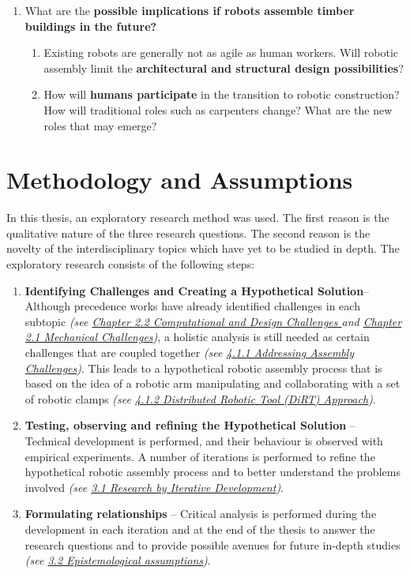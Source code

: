 \documentclass[11pt]{book}
\begin{document}
\begin{enumerate}
\begin{enumerate}
\end{enumerate}
	\item What are the \textbf{possible implications if robots assemble timber buildings in the future?}

\begin{enumerate}
	\item Existing robots are generally not as agile as human workers. Will robotic assembly limit the \textbf{architectural and structural design possibilities}?

	\item How will \textbf{humans participate} in the transition to robotic construction? How will traditional roles such as carpenters change? What are the new roles that may emerge?

\end{enumerate}
\end{enumerate}

\newpage

\chapter{Methodology and Assumptions}

In this thesis, an exploratory research method was used. The first reason is the qualitative nature of the three research questions. The second reason is the novelty of the interdisciplinary topics which have yet to be studied in depth. The exploratory research consists of the following steps:

\begin{enumerate}
	\item \textbf{Identifying Challenges and Creating a Hypothetical Solution}– Although precedence works have already identified challenges in each subtopic \textit{(see \underline{Chapter 2.2 Computational and Design Challenges }and \underline{Chapter 2.1 Mechanical Challenges})}, a holistic analysis is still needed as certain challenges that are coupled together \textit{(see \underline{4.1.1 Addressing Assembly Challenges})}. This leads to a hypothetical robotic assembly process that is based on the idea of a robotic arm manipulating and collaborating with a set of robotic clamps \textit{(see \underline{4.1.2 Distributed Robotic Tool (DiRT) Approach})}.

	\item \textbf{Testing, observing and refining the Hypothetical Solution} – Technical development is performed, and their behaviour is observed with empirical experiments. A number of iterations is performed to refine the hypothetical robotic assembly process and to better understand the problems involved \textit{(see \underline{3.1 Research by Iterative Development})}.

	\item \textbf{Formulating relationships }– Critical analysis is performed during the development in each iteration and at the end of the thesis to answer the research questions and to provide possible avenues for future in-depth studies \textit{(see \underline{3.2 Epistemological assumptions})}.

\end{enumerate}
\end{document}
